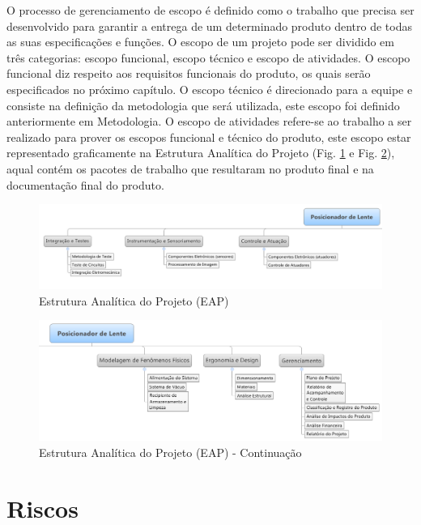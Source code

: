 O processo de gerenciamento de escopo é definido como o trabalho que precisa ser desenvolvido para garantir a entrega de um determinado produto dentro de todas as suas especificações e funções. O escopo de um projeto pode ser dividido em três categorias: escopo funcional, escopo técnico e escopo de atividades. O escopo funcional diz respeito aos requisitos funcionais do produto, os quais serão especificados no próximo capítulo. O escopo técnico é direcionado para a equipe e consiste na definição da metodologia que será utilizada, este escopo foi definido anteriormente em Metodologia. O escopo de atividades refere-se ao trabalho a ser realizado para prover os escopos funcional e técnico do produto, este escopo estar representado graficamente na Estrutura Analítica do Projeto (Fig. \ref{fig05} e Fig. \ref{fig06}), aqual contém os pacotes de trabalho que resultaram no produto final e na documentação final do produto. 

\begin{figure}[H]
		\centering
			\includegraphics[scale=0.6]{figuras/eap.png}
		\caption{Estrutura Analítica do Projeto (EAP)}
		\label{fig05}
\end{figure}


\begin{figure}[H]
		\centering
			\includegraphics[scale=0.6]{figuras/eap2.png}
		\caption{Estrutura Analítica do Projeto (EAP) - Continuação}
		\label{fig06}
\end{figure}

\section[Riscos]{Riscos}


